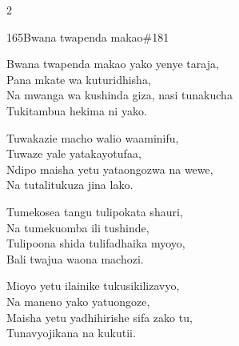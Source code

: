 \begin{multicols}{2}
\begin{hymn}{165}{Bwana twapenda makao}{\#181}
\begin{stanza}
Bwana twapenda makao yako yenye taraja,\\
Pana mkate wa kuturidhisha,\\
Na mwanga wa kushinda giza, nasi tunakucha\\
Tukitambua hekima ni yako.
\end{stanza}
\begin{chorus}
Tuwakazie macho walio waaminifu,\\
Tuwaze yale yatakayotufaa,\\
Ndipo maisha yetu yataongozwa na wewe,\\
Na tutalitukuza jina lako.
\end{chorus}
\begin{stanza}
Tumekosea tangu tulipokata shauri,\\
Na tumekuomba ili tushinde,\\
Tulipoona shida tulifadhaika myoyo,\\
Bali twajua waona machozi.
\end{stanza}
\begin{stanza}
Mioyo yetu ilainike tukusikilizavyo,\\
Na maneno yako yatuongoze,\\
Maisha yetu yadhihirishe sifa zako tu,\\
Tunavyojikana na kukutii.
\end{stanza}
\end{hymn}


\end{multicols}
